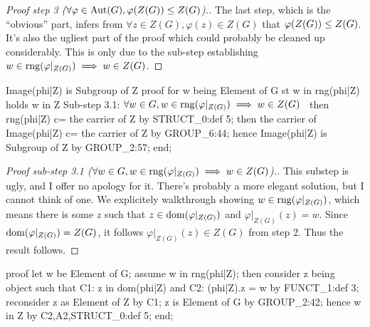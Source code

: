 \begin{proof}[Proof step 3 ($\forall\varphi\in\operatorname{Aut}(G),\varphi(Z(G))\leq Z(G)$).]
The last step, which is the ``obvious'' part, infers from
$\forall z\in Z(G),\varphi(z)\in Z(G)$ that $\varphi(Z(G))\leq Z(G)$.
It's also the ugliest part of the proof which could probably be cleaned
up considerably. This is only due to the sub-step establishing
$w\in\operatorname{rng}(\varphi|_{Z(G)})\implies w\in Z(G)$.
\end{proof}

\nwenddocs{}\endmoddef\nwstartdeflinemarkup{}\nwenddeflinemarkup
Image(phi|Z) is Subgroup of Z
proof
  for w being Element of G st w in rng(phi|Z) holds w in Z
  \LA{}Sub-step 3.1: $\forall w\in G,w\in\operatorname{rng}(\varphi|_{Z(G)})\implies w\in Z(G)$~{\nwtagstyle{}}\RA{}
  then rng(phi|Z) c= the carrier of Z by STRUCT_0:def 5;
  then the carrier of Image(phi|Z) c= the carrier of Z by GROUP_6:44;
  hence Image(phi|Z) is Subgroup of Z by GROUP_2:57;
end;
\nwendcode{}\nwdocspar

\begin{proof}[Proof sub-step 3.1 ($\forall w\in G,w\in\operatorname{rng}(\varphi|_{Z(G)})\implies w\in Z(G)$).]
This substep is ugly, and I offer no apology for it. There's probably
a more elegant solution, but I cannot think of one. We explicitely
walkthrough showing $w\in\operatorname{rng}(\varphi|_{Z(G)})$, which means there is
some $z$ such that $z\in\operatorname{dom}(\varphi|_{Z(G)})$ and $\varphi|_{Z(G)}(z) = w$.
Since $\operatorname{dom}(\varphi|_{Z(G)})=Z(G)$, it follows $\varphi|_{Z(G)}(z)\in Z(G)$
from step 2. Thus the result follows.
\end{proof}

\nwenddocs{}\endmoddef\nwstartdeflinemarkup{}\nwenddeflinemarkup
proof
  let w be Element of G;
  assume w in rng(phi|Z);
  then consider z being object such that
  C1: z in dom(phi|Z) and
  C2: (phi|Z).z = w by FUNCT_1:def 3;
  reconsider z as Element of Z by C1;
  z is Element of G by GROUP_2:42;
  hence w in Z by C2,A2,STRUCT_0:def 5;
end;
\nwendcode{}\nwdocspar

